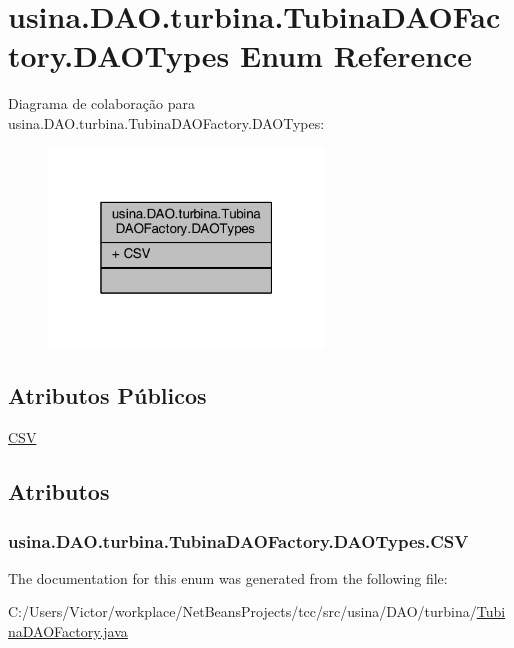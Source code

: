 \hypertarget{enumusina_1_1_d_a_o_1_1turbina_1_1_tubina_d_a_o_factory_1_1_d_a_o_types}{\section{usina.\-D\-A\-O.\-turbina.\-Tubina\-D\-A\-O\-Factory.\-D\-A\-O\-Types Enum Reference}
\label{enumusina_1_1_d_a_o_1_1turbina_1_1_tubina_d_a_o_factory_1_1_d_a_o_types}
}


Diagrama de colaboração para usina.\-D\-A\-O.\-turbina.\-Tubina\-D\-A\-O\-Factory.\-D\-A\-O\-Types\-:\nopagebreak
\begin{figure}[H]
\begin{center}
\leavevmode
\includegraphics[width=208pt]{enumusina_1_1_d_a_o_1_1turbina_1_1_tubina_d_a_o_factory_1_1_d_a_o_types__coll__graph}
\end{center}
\end{figure}
\subsection*{Atributos Públicos}
\begin{DoxyCompactItemize}
\item 
\hyperlink{enumusina_1_1_d_a_o_1_1turbina_1_1_tubina_d_a_o_factory_1_1_d_a_o_types_a65cd2f40d00a25748553b7c01f8b27a1}{C\-S\-V}
\end{DoxyCompactItemize}


\subsection{Atributos}
\hypertarget{enumusina_1_1_d_a_o_1_1turbina_1_1_tubina_d_a_o_factory_1_1_d_a_o_types_a65cd2f40d00a25748553b7c01f8b27a1}{
\subsubsection[{C\-S\-V}]{\setlength{\rightskip}{0pt plus 5cm}usina.\-D\-A\-O.\-turbina.\-Tubina\-D\-A\-O\-Factory.\-D\-A\-O\-Types.\-C\-S\-V}}\label{enumusina_1_1_d_a_o_1_1turbina_1_1_tubina_d_a_o_factory_1_1_d_a_o_types_a65cd2f40d00a25748553b7c01f8b27a1}


The documentation for this enum was generated from the following file\-:\begin{DoxyCompactItemize}
\item 
C\-:/\-Users/\-Victor/workplace/\-Net\-Beans\-Projects/tcc/src/usina/\-D\-A\-O/turbina/\hyperlink{_tubina_d_a_o_factory_8java}{Tubina\-D\-A\-O\-Factory.\-java}\end{DoxyCompactItemize}

